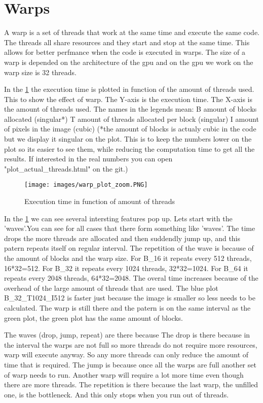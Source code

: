 \section{Warps}
\label{sec:warps}

A warp is a set of threads that work at the same time and execute the same code. The threads all share resources and they start and stop at the same time. This allows for better perfmance when the code is executed in warps. The size of a warp is depended on the architecture of the gpu and on the gpu we work on the warp size is 32 threads.

In the \ref{figure:warp_zoom} the execution time is plotted in function of the amount of threads used. This to show the effect of warp.
The Y-axis is the execution time.
The X-axis is the amount of threads used.
The names in the legends mean: 
B amount of blocks allocated (singular*)
T amount of threads allocated per block (singular)
I amount of pixels in the image (cubic)
(*the amount of blocks is actualy cubic in the code but we display it singular on the plot. This is to keep the numbers lower on the plot so its easier to see them, while reducing the computation time to get all the results. If interested in the real numbers you can open "plot_actual_threads.html" on the git.)

\begin{figure}[H]
    \centering
    \texttt{[image: images/warp\_plot\_zoom.PNG]}
    \caption{Execution time in function of amount of threads}
    \label{figure:warp_zoom}
\end{figure}

In the \ref{figure:warp_zoom} we can see several intersting features pop up. Lets start with the 'waves'.You can see for all cases that there form something like 'waves'. The time drops the more threads are allocated and then suddendly jump up, and this patern repeats itself on regular interval. 
The repetition of the wave is because of the amount of blocks and the warp size. For B_16 it repeats every 512 threads, 16*32=512. For B_32 it repeats every 1024 threads, 32*32=1024. For B_64 it repeats every 2048 threads, 64*32=2048. 
The overal time increases because of the overhead of the large amount of threads that are used.
The blue plot B_32_T1024_I512 is faster just because the image is smaller so less needs to be calculated. The warp is still there and the patern is on the same interval as the green plot, the green plot has the same amount of blocks.

The waves (drop, jump, repeat) are there because 
The drop is there because in the interval the warps are not full so more threads do not require more resources, warp  will execute anyway. So any more threads can only reduce the amount of time that is required.
The jump is because once all the warps are full another set of warp needs to run. Another warp will require a lot more time even though there are more threads.
The repetition is there because the last warp, the unfilled one, is the bottleneck. And this only stops when you run out of threads.

